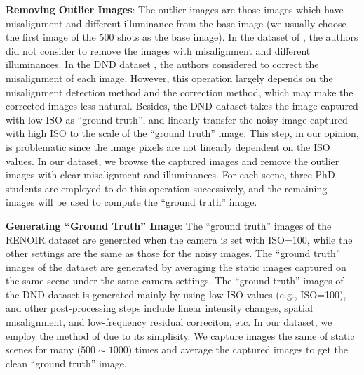 \textbf{Removing Outlier Images}: The outlier images are those images which have misalignment and different illuminance from the base image (we usually choose the first image of the 500 shots as the base image). In the dataset of \cite{crosschannel2016}, the authors did not consider to remove the images with misalignment and different illuminances. In the DND dataset \cite{dnd2017}, the authors considered to correct the misalignment of each image. However, this operation largely depends on the misalignment detection method and the correction method, which may make the corrected images less natural. Besides, the DND dataset \cite{dnd2017} takes the image captured with low ISO as ``ground truth'', and linearly transfer the noisy image captured with high ISO to the scale of the ``ground truth'' image. This step, in our opinion, is problematic since the image pixels are not linearly dependent on the ISO values. In our dataset, we browse the captured images and remove the outlier images with clear misalignment and illuminances. For each scene, three PhD students are employed to do this operation successively, and the remaining images will be used to compute the ``ground truth'' image.
 


\textbf{Generating ``Ground Truth'' Image}: The ``ground truth'' images of the RENOIR dataset \cite{RENOIR2014} are generated when the camera is set with ISO=100, while the other settings are the same as those for the noisy images. The ``ground truth'' images of the dataset \cite{crosschannel2016} are generated by averaging the static images captured on the same scene under the same camera settings. The ``ground truth'' images of the DND dataset \cite{dnd2017} is generated mainly by using low ISO values (e.g., ISO=100), and other post-processing steps include linear intensity changes, spatial misalignment, and low-frequency residual correciton, etc. In our dataset, we employ the method of \cite{crosschannel2016} due to its simplisity. We capture images the same of static scenes for many ($500\sim1000$) times and average the captured images to get the clean ``ground truth'' image. 

